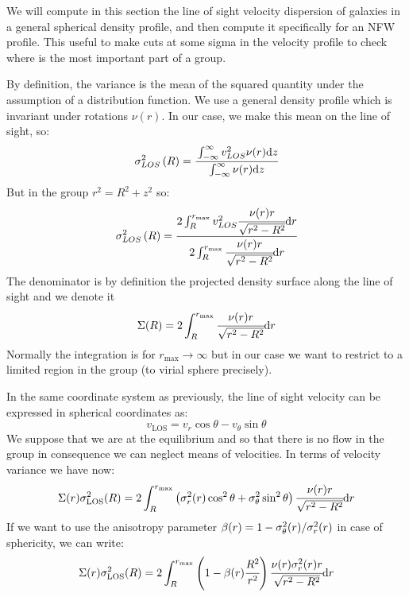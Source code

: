 We will compute in this section the line of sight velocity dispersion of
galaxies in a general spherical density profile, and then compute it
specifically for an NFW profile. This useful to make cuts at some sigma in the
velocity profile to check where is the most important part of a group.

By definition, the variance is the mean of the squared quantity under the
assumption of a distribution function. We use a general density profile which
is invariant under rotations $\nu{(r)}$. In our case, we make this mean on the
line of sight, so:
%
\begin{equation}
    \sigma_{LOS}^2\left({R}\right)=\cfrac{\int_{-\infty}^{\infty}{v_{LOS}^2}\nu{(r)}{\rm{d}}{z}}
    {\int_{-\infty}^{\infty}\nu{(r)}{\rm{d}}{z}}
\end{equation}
%
But in the group $r^2=R^2+z^2$ so:
%
\begin{equation}
    \sigma_{LOS}^2\left({R}\right)=\cfrac{2\int_{R}^{r_{\max}}{v_{LOS}^2}\cfrac{\nu{(r)}{r}}{\sqrt{r^2-R^2}}{\rm{d}}{r}}
    {2\int_{R}^{r_{\max}}\cfrac{\nu{(r)}{r}}{\sqrt{r^2-R^2}}{\rm{d}}{r}}
\end{equation}
%
The denominator is by definition the projected density surface along the line
of sight and we denote it
%
\begin{equation}
    \Sigma(R) = 2\int_{R}^{r_{\max}}\cfrac{\nu{(r)}{r}}{\sqrt{r^2-R^2}}{\rm{d}}{r}
\end{equation}
%
Normally the integration is for $r_{\max}\rightarrow\infty$ but in our case we
want to restrict to a limited region in the group (to virial sphere precisely).

In the same coordinate system as previously, the line of sight velocity can be
expressed in spherical coordinates as:
%
\begin{equation}
    v_{\mathrm{LOS}} = v_r \cos\theta - v_\theta \sin\theta
\end{equation}
%
We suppose that we are at the equilibrium and so that there is no flow in the
group in consequence we can neglect means of velocities. In terms of velocity
variance we have now:
%
\begin{equation}
    \Sigma(r)\sigma_{\mathrm{LOS}}^2(R) = 2\int_R^{r_{\max}}
    \left({\sigma_r^2(r)\cos^2\theta+\sigma_\theta^2\sin^2\theta}\right)
    \cfrac{\nu{(r)}{r}}{\sqrt{r^2-R^2}}{\rm{d}}{r}
\end{equation}
%
If we want to use the anisotropy parameter
$\beta(r)=1-\sigma_\theta^2(r)/\sigma_r^2(r)$ in case of sphericity, we can
write:
%
\begin{equation}
    \Sigma(r)\sigma_{\mathrm{LOS}}^2(R) = 2\int_R^{r_{\max}}
    \left({1-\beta(r)\cfrac{R^2}{r^2}}\right)
    \cfrac{\nu{(r)}{\sigma_r^2(r)}{r}}{\sqrt{r^2-R^2}}{\rm{d}}{r}
\end{equation}

